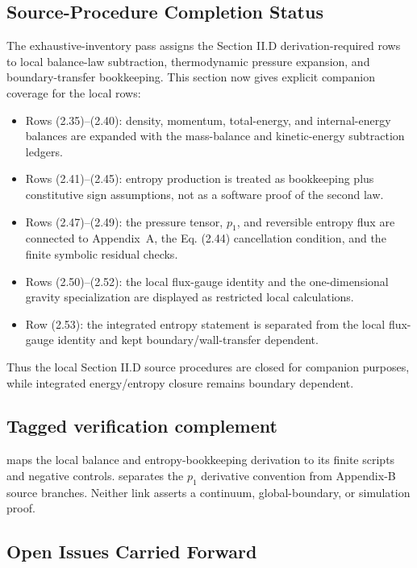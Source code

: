 \subsection{Source-Procedure Completion Status}

The exhaustive-inventory pass assigns the Section II.D derivation-required
rows to local balance-law subtraction, thermodynamic pressure expansion, and
boundary-transfer bookkeeping.  This section now gives explicit companion
coverage for the local rows:
\begin{itemize}
\item Rows (2.35)--(2.40): density, momentum, total-energy, and
  internal-energy balances are expanded with the mass-balance and
  kinetic-energy subtraction ledgers.
\item Rows (2.41)--(2.45): entropy production is treated as
  bookkeeping plus constitutive sign assumptions, not as a software proof of
  the second law.
\item Rows (2.47)--(2.49): the pressure tensor, \(p_1\), and
  reversible entropy flux are connected to Appendix~A, the Eq. (2.44)
  cancellation condition, and the finite symbolic residual checks.
\item Rows (2.50)--(2.52): the local flux-gauge identity and the
  one-dimensional gravity specialization are displayed as restricted local
  calculations.
\item Row (2.53): the integrated entropy statement is separated from the local
  flux-gauge identity and kept boundary/wall-transfer dependent.
\end{itemize}
Thus the local Section II.D source procedures are closed for companion
purposes, while integrated energy/entropy closure remains boundary dependent.

\subsection*{Tagged verification complement}

 maps the
local balance and entropy-bookkeeping derivation to its finite scripts and
negative controls. 
separates the \(p_1\) derivative convention from Appendix-B source branches.
Neither link asserts a continuum, global-boundary, or simulation proof.

\subsection{Open Issues Carried Forward}

